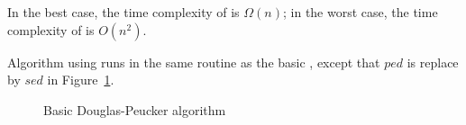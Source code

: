 In the best case, the time complexity of \dpa is $\Omega(n)$; in the worst case, the time complexity of \dpa is $O(n^2)$.

Algorithm \dpa using \sed \cite{Meratnia:Spatiotemporal} runs in the same routine as the basic \dpa, except that $ped$ is replace by $sed$ in Figure~\ref{alg:dp}.



\begin{figure}[tb!]
\begin{center}
{\small
\begin{minipage}{3.3in}
\myhrule \vspace{-1ex}
\vspace{-2.5ex}
\myhrule
\end{minipage}
}
\end{center}
\vspace{-3ex}
\caption{\small Basic Douglas-Peucker algorithm}
\label{alg:dp}
\vspace{-2ex}
\end{figure}


